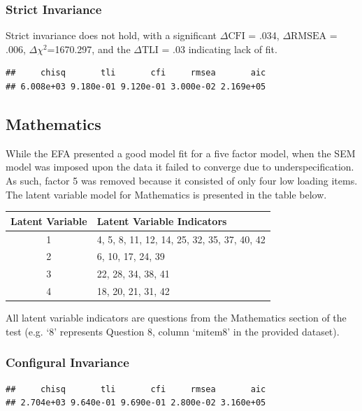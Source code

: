 \documentclass{article}\usepackage[]{graphicx}\usepackage[]{color}
\makeatletter
\newenvironment{kframe}{%
 \def\at@end@of@kframe{}%
 \ifinner\ifhmode%
  \def\at@end@of@kframe{\end{minipage}}%
  \begin{minipage}{\columnwidth}%
 \fi\fi%
 \def\FrameCommand##1{\hskip\@totalleftmargin \hskip-\fboxsep
 \colorbox{shadecolor}{##1}\hskip-\fboxsep
     \hskip-\linewidth \hskip-\@totalleftmargin \hskip\columnwidth}%
 \MakeFramed {\advance\hsize-\width
   \@totalleftmargin\z@ \linewidth\hsize
   \@setminipage}}%
 {\par\unskip\endMakeFramed%
 \at@end@of@kframe}
\newenvironment{knitrout}{}{} %
\makeatother
\begin{document}
\subsubsection*{Strict Invariance}
Strict invariance does not hold, with a significant $\Delta\mathrm{CFI}$ = .034, $\Delta\mathrm{RMSEA}$ = .006, $\Delta$$\chi^2$=1670.297, and the $\Delta\mathrm{TLI}$ = .03 indicating lack of fit.

\begin{knitrout}
\color{fgcolor}\begin{kframe}
\begin{verbatim}
##     chisq       tli       cfi     rmsea       aic 
## 6.008e+03 9.180e-01 9.120e-01 3.000e-02 2.169e+05
\end{verbatim}
\end{kframe}
\end{knitrout}

\subsection{Mathematics}
While the EFA presented a good model fit for a five factor model, when the SEM model was imposed upon the data it failed to converge due to underspecification. As such, factor 5 was removed because it consisted of only four low loading items. The latent variable model for Mathematics is presented in the table below. 

\vspace{0.25cm}

\begin{minipage}{\linewidth}
\begin{tabular}{|c|l|}
\multicolumn{1}{c}{Latent Variable} & \multicolumn{1}{l}{Latent Variable Indicators}\tabularnewline
\hline 
1 & 4, 5, 8, 11, 12, 14, 25, 32, 35, 37, 40, 42\tabularnewline
\hline 
2 & 6, 10, 17, 24, 39\tabularnewline
\hline 
3 & 22, 28, 34, 38, 41\tabularnewline
\hline 
4 & 18, 20, 21, 31, 42\tabularnewline
\hline 
\end{tabular}

\bigskip

All latent variable indicators are questions from the Mathematics section of the test (e.g. `8' represents Question 8, column `mitem8' in the provided dataset).

\end{minipage}


\subsubsection*{Configural Invariance}
\begin{knitrout}
\color{fgcolor}\begin{kframe}
\begin{verbatim}
##     chisq       tli       cfi     rmsea       aic 
## 2.704e+03 9.640e-01 9.690e-01 2.800e-02 3.160e+05
\end{verbatim}
\end{kframe}
\end{knitrout}
\end{document}
